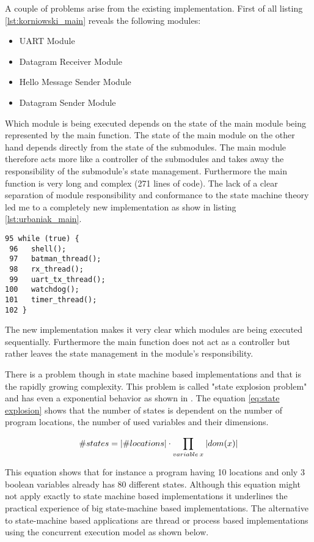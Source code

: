 A couple of problems arise from the existing implementation. First of all listing \ref{lst:korniowski_main} reveals the following modules:

\begin{itemize}
\item UART Module
\item Datagram Receiver Module
\item Hello Message Sender Module
\item Datagram Sender Module
\end{itemize}

Which module is being executed depends on the state of the main module being represented by the main function. The state of the main module on the other hand depends directly from the state of the submodules. The main module therefore acts more like a controller of the submodules and takes away the responsibility of the submodule's state management. Furthermore the main function is very long and complex (271 lines of code). The lack of a clear separation of module responsibility and conformance to the state machine theory led me to a completely new implementation as show in listing \ref{lst:urbaniak_main}.

\begin{lstlisting}[label=lst:urbaniak_main,caption=main function implementation]
 95 while (true) {
 96   shell();
 97   batman_thread();
 98   rx_thread();
 99   uart_tx_thread();
100   watchdog();
101   timer_thread();
102 }
\end{lstlisting}

The new implementation makes it very clear which modules are being executed sequentially. Furthermore the main function does not act as a controller but rather leaves the state management in the module's responsibility.

There is a problem though in state machine based implementations and that is the rapidly growing complexity. This problem is called "state explosion problem" and has even a exponential behavior as shown in \cite{katoen}. The equation \ref{eq:state explosion} shows that the number of states is dependent on the number of program locations, the number of used variables and their dimensions.

\begin{equation}
\label{eq:state explosion}
\#states = \lvert\#locations\rvert \cdot \prod_{variable \: x} \: \lvert dom(x)\rvert
\end{equation}

This equation shows that for instance a program having 10 locations and only 3 boolean variables already has 80 different states. Although this equation might not apply exactly to state machine based implementations it underlines the practical experience of big state-machine based implementations. The alternative to state-machine based applications are thread or process based implementations using the concurrent execution model as shown below.

